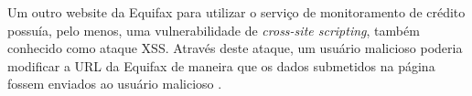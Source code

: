 \documentclass[conference]{IEEEtran}
\begin{document}
Um outro website da Equifax para utilizar o serviço de monitoramento de crédito possuía, pelo menos, uma vulnerabilidade de \textit{cross-site scripting}, também conhecido como ataque XSS. Através deste ataque, um
usuário malicioso poderia modificar a URL da Equifax de maneira que os dados submetidos na página fossem enviados ao usuário malicioso \cite{Whittaker2017}.



\end{document}
